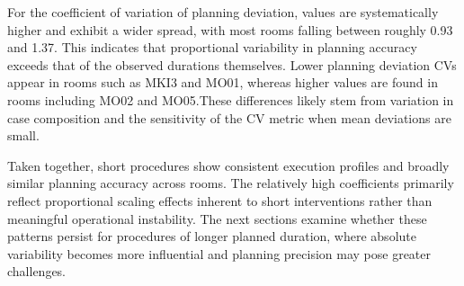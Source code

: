\documentclass[
]{article}
\begin{document}
For the coefficient of variation of planning deviation, values are
systematically higher and exhibit a wider spread, with most rooms
falling between roughly 0.93 and 1.37. This indicates that proportional
variability in planning accuracy exceeds that of the observed durations
themselves. Lower planning deviation CVs appear in rooms such as MKI3
and MO01, whereas higher values are found in rooms including MO02 and
MO05.These differences likely stem from variation in case composition
and the sensitivity of the CV metric when mean deviations are small.

Taken together, short procedures show consistent execution profiles and
broadly similar planning accuracy across rooms. The relatively high
coefficients primarily reflect proportional scaling effects inherent to
short interventions rather than meaningful operational instability. The
next sections examine whether these patterns persist for procedures of
longer planned duration, where absolute variability becomes more
influential and planning precision may pose greater challenges.
\end{document}
